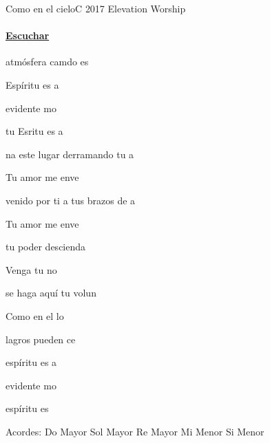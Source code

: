 \documentclass[12pt, spanish]{book}
\newcommand{\NotCCLIed}{\relax}
\begin{document}
    \begin{song}{Como en el cielo}{C}
    {2017} %
    {Elevation Worship}
    {} %
    {} %
        \ifChordBk
            \paragraph{\mbox{}\hfill\protect\href{https://open.spotify.com/intl-es/track/7gR2K9p8v5BB0uGLCcVimW}{Escuchar}\mbox{}\hfill}
        \fi

        \begin{SBOpGroup}
             atmósfera camdo es

             Espíritu es a

             evidente  mo

            tu Esritu es a
        \end{SBOpGroup}

        \begin{SBChorus}
            na este lugar derramando tu a

            Tu amor me enve

             venido por ti a tus brazos de a

            Tu amor me enve
        \end{SBChorus}

        \begin{SBOpGroup}
             tu poder descienda 

            Venga tu no

             se haga aquí tu volun

            Como en el lo
        \end{SBOpGroup}

        \begin{SBOpGroup}
            lagros pueden ce

             espíritu es a

             evidente  mo

             espíritu es  
        \end{SBOpGroup}

        \ifChordBk
        \begin{SBOpGroup}
            Acordes:\break
            \upchord{\C}\qquad Do Mayor \hfill
            \upchord{\G}\qquad Sol Mayor \hfill\null\break
            \upchord{\D}\qquad Re Mayor \hfill
            \upchord{\Em}\qquad Mi Menor \hfill\null\break
            \upchord{\Bm}\qquad Si Menor \hfill\null\break
        \end{SBOpGroup}
        \fi
    \end{song}
\end{document}
